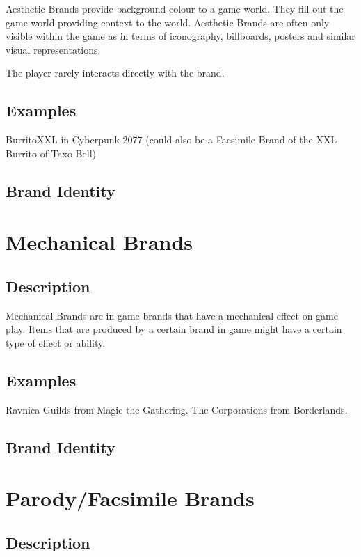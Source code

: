 Aesthetic Brands provide background colour to a game world. They fill out the game world providing context to the world. Aesthetic Brands are often only visible within the game as in terms of iconography, billboards, posters and similar visual representations.

The player rarely interacts directly with the brand.
\subsection{Examples}

BurritoXXL in Cyberpunk 2077 (could also be a Facsimile Brand of the XXL Burrito of Taxo Bell)

\subsection{Brand Identity}

\section{Mechanical Brands}

\subsection{Description}

Mechanical Brands are in-game brands that have a mechanical effect on game play. Items that are produced by a certain brand in game might have a certain type of effect or ability.

\subsection{Examples}

Ravnica Guilds from Magic the Gathering.
The Corporations from Borderlands.

\subsection{Brand Identity}

\section{Parody/Facsimile Brands}

\subsection{Description}


